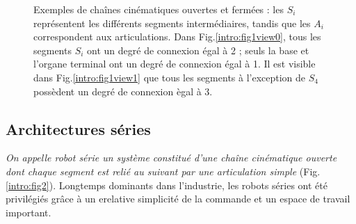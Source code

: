 \begin{figure}[!ht]
  \centering
       \hfill
    \caption{\footnotesize{Exemples de cha\^ines cinématiques ouvertes et fermées : les $S_i$ représentent les différents segments intermédiaires, tandis que les $A_i$ correspondent aux articulations. Dans Fig.\ref{intro:fig1view0}, tous les segments $S_i$ ont un degré de connexion égal à 2 ; seuls la base et l'organe terminal ont un degré de connexion égal à 1. Il est visible dans Fig.\ref{intro:fig1view1} que tous les segments à l'exception de $S_4$ possèdent un degré de connexion ègal à 3.}}
\label{intro:fig1}
\end{figure}

\subsection{Architectures séries}

{\it On appelle robot série un système constitué d'une chaîne cinématique ouverte dont chaque segment est relié au suivant par une articulation simple} (Fig.\ref{intro:fig2}). Longtemps dominants dans l'industrie, les robots séries ont été privilégiés grâce à un erelative simplicité de la commande et un espace de travail important.

